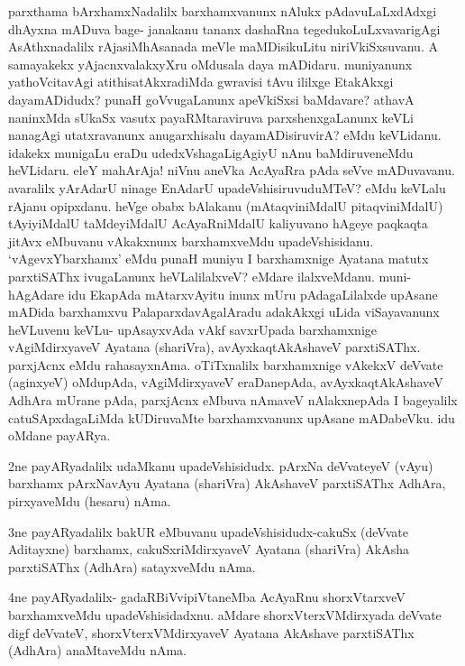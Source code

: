 \begin{artha}
parxthama bArxhamxNadalilx barxhamxvanunx nAlukx pAdavuLaLxdAdxgi dhAyxna mADuva bage- janakanu tananx dashaRna tegedukoLuLxvavarigAgi AsAthxnadalilx rAjasiMhAsanada meVle maMDisikuLitu niriVkiSxsuvanu. A samayakekx yAjacnxvalakxyXru oMdusala daya mADidaru. muniyanunx yathoVcitavAgi atithisatAkxradiMda gwravisi tAvu ililxge EtakAkxgi dayamADidudx? punaH goVvugaLanunx apeVkiSxsi baMdavare? athavA naninxMda sUkaSx vasutx payaRMtaraviruva parxshenxgaLanunx keVLi nanagAgi utatxravanunx anugarxhisalu dayamADisiruvirA? eMdu keVLidanu. idakekx munigaLu eraDu udedxVshagaLigAgiyU nAnu baMdiruveneMdu heVLidaru. eleY mahArAja! niVnu aneVka AcAyaRra pAda seVve mADuvavanu. avaralilx yArAdarU ninage EnAdarU upadeVshisiruvuduMTeV? eMdu keVLalu rAjanu opipxdanu. heVge obabx bAlakanu (mAtaqviniMdalU pitaqviniMdalU) tAyiyiMdalU taMdeyiMdalU AcAyaRniMdalU kaliyuvano hAgeye paqkaqta jitAvx eMbuvanu vAkakxnunx barxhamxveMdu upadeVshisidanu. `vAgevxYbarxhamx' eMdu punaH muniyu I barxhamxnige Ayatana matutx parxtiSAThx ivugaLanunx heVLalilalxveV? eMdare ilalxveMdanu. muni-hAgAdare idu EkapAda mAtarxvAyitu inunx mUru pAdagaLilalxde upAsane mADida barxhamxvu PalaparxdavAgalAradu adakAkxgi uLida viSayavanunx heVLuvenu keVLu- upAsayxvAda vAkf savxrUpada barxhamxnige vAgiMdirxyaveV Ayatana (shariVra), avAyxkaqtAkAshaveV parxtiSAThx. parxjAcnx eMdu rahasayxnAma. oTiTxnalilx barxhamxnige vAkekxV deVvate (aginxyeV) oMdupAda, vAgiMdirxyaveV eraDanepAda, avAyxkaqtAkAshaveV AdhAra mUrane pAda, parxjAcnx eMbuva nAmaveV nAlakxnepAda I bageyalilx catuSApxdagaLiMda kUDiruvaMte barxhamxvanunx upAsane mADabeVku. idu oMdane payARya. 
\end{artha}

\begin{artha}
2ne payARyadalilx udaMkanu upadeVshisidudx. pArxNa deVvateyeV (vAyu) barxhamx pArxNavAyu Ayatana (shariVra) AkAshaveV parxtiSAThx AdhAra, pirxyaveMdu (hesaru) nAma.
\end{artha}

\begin{artha}
3ne payARyadalilx bakUR eMbuvanu upadeVshisidudx-cakuSx (deVvate Aditayxne) barxhamx, cakuSxriMdirxyaveV Ayatana (shariVra) AkAsha parxtiSAThx (AdhAra) satayxveMdu nAma.
\end{artha}

\begin{artha}%
4ne payARyadalilx- gadaRBiVvipiVtaneMba AcAyaRnu shorxVtarxveV barxhamxveMdu upadeVshisidadxnu. aMdare shorxVterxVMdirxyada deVvate digf deVvateV, shorxVterxVMdirxyaveV Ayatana AkAshave parxtiSAThx (AdhAra) anaMtaveMdu nAma. 
\end{artha}

